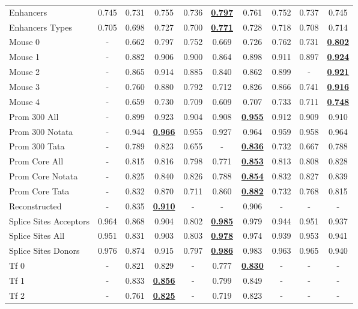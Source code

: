 \begin{table*}[h!]
\begin{center}
\begin{tabular}{l|cc|ccc|cccc}
Enhancers & 0.745 & 0.731 & 0.755 & 0.736 & {\ul \textbf{0.797}} & 0.761 & 0.752 & 0.737 & 0.745 \\
Enhancers Types & 0.705 & 0.698 & 0.727 & 0.700 & {\ul \textbf{0.771}} & 0.728 & 0.718 & 0.708 & 0.714 \\
Mouse 0 & - & 0.662 & 0.797 & 0.752 & 0.669 & 0.726 & 0.762 & 0.731 & {\ul \textbf{0.802}} \\
Mouse 1 & - & 0.882 & 0.906 & 0.900 & 0.864 & 0.898 & 0.911 & 0.897 & {\ul \textbf{0.924}} \\
Mouse 2 & - & 0.865 & 0.914 & 0.885 & 0.840 & 0.862 & 0.899 & - & {\ul \textbf{0.921}} \\
Mouse 3 & - & 0.760 & 0.880 & 0.792 & 0.712 & 0.826 & 0.866 & 0.741 & {\ul \textbf{0.916}} \\
Mouse 4 & - & 0.659 & 0.730 & 0.709 & 0.609 & 0.707 & 0.733 & 0.711 & {\ul \textbf{0.748}} \\
Prom 300 All & - & 0.899 & 0.923 & 0.904 & 0.908 & {\ul \textbf{0.955}} & 0.912 & 0.909 & 0.910 \\
Prom 300 Notata & - & 0.944 & {\ul \textbf{0.966}} & 0.955 & 0.927 & 0.964 & 0.959 & 0.958 & 0.964 \\
Prom 300 Tata & - & 0.789 & 0.823 & 0.655 & - & {\ul \textbf{0.836}} & 0.732 & 0.667 & 0.788 \\
Prom Core All & - & 0.815 & 0.816 & 0.798 & 0.771 & {\ul \textbf{0.853}} & 0.813 & 0.808 & 0.828 \\
Prom Core Notata & - & 0.825 & 0.840 & 0.826 & 0.788 & {\ul \textbf{0.854}} & 0.832 & 0.827 & 0.839 \\
Prom Core Tata & - & 0.832 & 0.870 & 0.711 & 0.860 & {\ul \textbf{0.882}} & 0.732 & 0.768 & 0.815 \\
Reconstructed & - & 0.835 & {\ul \textbf{0.910}} & - & - & 0.906 & - & - & - \\
Splice Sites Acceptors & 0.964 & 0.868 & 0.904 & 0.802 & {\ul \textbf{0.985}} & 0.979 & 0.944 & 0.951 & 0.937 \\
Splice Sites All & 0.951 & 0.831 & 0.903 & 0.803 & {\ul \textbf{0.978}} & 0.974 & 0.939 & 0.953 & 0.941 \\
Splice Sites Donors & 0.976 & 0.874 & 0.915 & 0.797 & {\ul \textbf{0.986}} & 0.983 & 0.963 & 0.965 & 0.940 \\
Tf 0 & - & 0.821 & 0.829 & - & 0.777 & {\ul \textbf{0.830}} & - & - & - \\
Tf 1 & - & 0.833 & {\ul \textbf{0.856}} & - & 0.799 & 0.849 & - & - & - \\
Tf 2 & - & 0.761 & {\ul \textbf{0.825}} & - & 0.719 & 0.823 & - & - & - \\

\end{tabular}
\end{center}
\end{table*}
